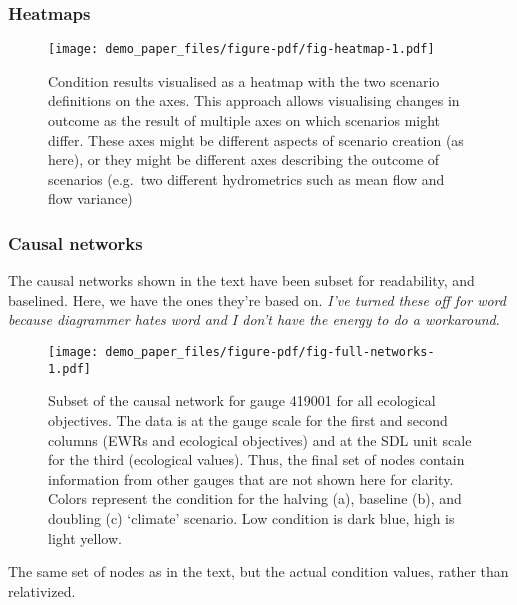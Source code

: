 \documentclass[
  number]{elsarticle}
\begin{document}
\hypertarget{heatmaps}{%
\subsubsection{Heatmaps}\label{heatmaps}}

\begin{figure}

{\centering \texttt{[image: demo\_paper\_files/figure-pdf/fig-heatmap-1.pdf]}

}

\caption{\label{fig-heatmap}Condition results visualised as a heatmap
with the two scenario definitions on the axes. This approach allows
visualising changes in outcome as the result of multiple axes on which
scenarios might differ. These axes might be different aspects of
scenario creation (as here), or they might be different axes describing
the outcome of scenarios (e.g.~two different hydrometrics such as mean
flow and flow variance)}

\end{figure}

\hypertarget{causal-networks}{%
\subsubsection{Causal networks}\label{causal-networks}}

The causal networks shown in the text have been subset for readability,
and baselined. Here, we have the ones they're based on. \emph{I've
turned these off for word because diagrammer hates word and I don't have
the energy to do a workaround}.

\begin{figure}

{\centering \texttt{[image: demo\_paper\_files/figure-pdf/fig-full-networks-1.pdf]}

}

\caption{\label{fig-full-networks}Subset of the causal network for gauge
419001 for all ecological objectives. The data is at the gauge scale for
the first and second columns (EWRs and ecological objectives) and at the
SDL unit scale for the third (ecological values). Thus, the final set of
nodes contain information from other gauges that are not shown here for
clarity. Colors represent the condition for the halving (a), baseline
(b), and doubling (c) `climate' scenario. Low condition is dark blue,
high is light yellow.}

\end{figure}

The same set of nodes as in the text, but the actual condition values,
rather than relativized.
\end{document}
